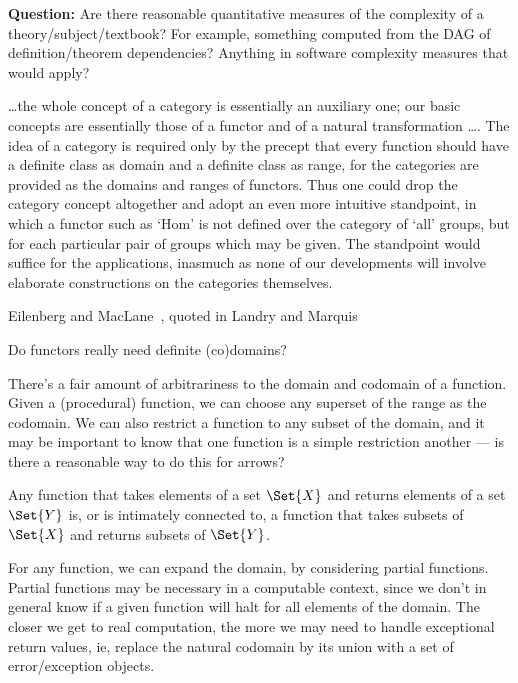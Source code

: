 \documentclass[11pt]{book}
\begin{document}
\textbf{Question:} Are there reasonable quantitative measures
of the complexity of a theory/subject/textbook?
For example, something computed from the DAG of
definition/theorem dependencies?
Anything in software complexity measures that would apply?

\label{sec:arrow-more-general}

\epigraph{\ldots the whole concept of a category is essentially 
an auxiliary
one; our basic concepts are essentially those of a functor and of
a natural transformation {\ldots}. 
The idea of a category is required
only by the precept that every function should have a definite
class as domain and a definite class as range, for the categories
are provided as the domains and ranges of functors. Thus one
could drop the category concept altogether and adopt an even
more intuitive standpoint, in which a functor such as ‘Hom’ is
not defined over the category of ‘all’ groups, 
but for each particular
pair of groups which may be given. The standpoint would
suffice for the applications, inasmuch as none of our developments
will involve elaborate constructions on the categories
themselves.}
{Eilenberg and 
MacLane~\cite[p~247]{eilenberg_maclane_1945},
quoted in Landry and 
Marquis~\cite[p~3]{landry_marquis_2005_cat_th_in_context}}

Do functors really need definite (co)domains?

There's a fair amount of arbitrariness 
to the domain and codomain of a function.
Given a (procedural) function,
we can choose any superset of the range as the codomain.
We can also restrict a function to any subset of the domain,
and it may be important to know that one function is a simple 
restriction another --- is there a reasonable way to do this
for arrows?

Any function that takes elements of a set $\Set{X}$
and returns elements of a set $\Set{Y}$
is, or is intimately connected to, 
a function that takes subsets of $\Set{X}$ and returns
subsets of $\Set{Y}$.

For any function, we can expand the domain, by considering partial
functions. 
Partial functions may be necessary in a computable context,
since we don't in general know if a given function will
halt for all elements of the domain.
The closer we get to real computation, the more we may need to
handle exceptional return values, ie, replace the natural
codomain by its union with a set of error/exception objects.
\end{document}

